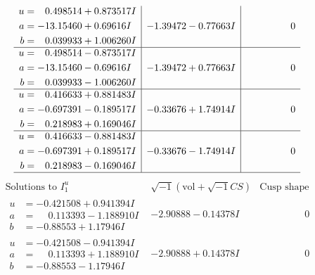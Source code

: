 \documentclass[1p]{elsarticle_modified}
\theoremstyle{definition}
\newcommand{\I}{\sqrt{-1}}
\begin{document}
$$\begin{array}{c|c|c}
\begin{aligned}
u &= \phantom{-}0.498514 + 0.873517 I \\
a &= -13.15460 + 0.69616 I \\
b &= \phantom{-}0.039933 + 1.006260 I\end{aligned}
 & -1.39472 - 0.77663 I & \phantom{-0.000000 } 0 \\ \hline\begin{aligned}
u &= \phantom{-}0.498514 - 0.873517 I \\
a &= -13.15460 - 0.69616 I \\
b &= \phantom{-}0.039933 - 1.006260 I\end{aligned}
 & -1.39472 + 0.77663 I & \phantom{-0.000000 } 0 \\ \hline\begin{aligned}
u &= \phantom{-}0.416633 + 0.881483 I \\
a &= -0.697391 - 0.189517 I \\
b &= \phantom{-}0.218983 + 0.169046 I\end{aligned}
 & -0.33676 + 1.74914 I & \phantom{-0.000000 } 0 \\ \hline\begin{aligned}
u &= \phantom{-}0.416633 - 0.881483 I \\
a &= -0.697391 + 0.189517 I \\
b &= \phantom{-}0.218983 - 0.169046 I\end{aligned}
 & -0.33676 - 1.74914 I & \phantom{-0.000000 } 0\\
 \hline 
 \end{array}$$\newpage$$\begin{array}{c|c|c}  
\text{Solutions to }I^u_{1}& \I (\text{vol} + \sqrt{-1}CS) & \text{Cusp shape}\\
 \hline 
\begin{aligned}
u &= -0.421508 + 0.941394 I \\
a &= \phantom{-}0.113393 - 1.188910 I \\
b &= -0.88553 + 1.17946 I\end{aligned}
 & -2.90888 - 0.14378 I & \phantom{-0.000000 } 0 \\ \hline\begin{aligned}
u &= -0.421508 - 0.941394 I \\
a &= \phantom{-}0.113393 + 1.188910 I \\
b &= -0.88553 - 1.17946 I\end{aligned}
 & -2.90888 + 0.14378 I & \phantom{-0.000000 } 0 \\ \hline\begin{aligned}

\end{aligned}
\end{array}$$
\end{document}
